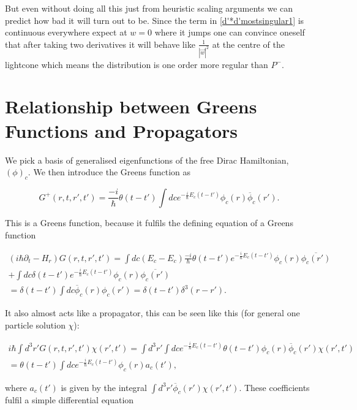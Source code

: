 \documentclass[a4paper,11pt]{article}
\begin{document}
But even without doing all this just from heuristic scaling arguments we can predict how bad it will turn out to be. 
Since the term in 
\eqref{d'*d'mostsingular1} is continuous everywhere expect at \(w=0\) where it jumps one can convince oneself that
after taking two derivatives it will behave like \(\frac{1}{|\vec{w}|^2}\) at the centre of the lightcone which means the 
distribution is one order more regular than \(P^-\).



\appendix
\section{Relationship between Greens Functions and Propagators}\label{AppendixPropagatorGreens}

We pick a basis of generalised eigenfunctions of the free Dirac Hamiltonian, \((\phi)_c\). We then introduce the Greens function as

\begin{equation}
G^+(r,t,r',t')=\frac{-i}{\hbar} \theta(t-t') \int dc e^{-\frac{i}{\hbar} E_c(t-t')} \phi_c (r)\overline{\phi}_c(r') .
\end{equation}

This is a Greens function, because it fulfils the defining equation of a Greens function

\begin{align}
(i\hbar \partial_t -H_r) G(r,t,r',t')=\int dc  (E_c-E_c)\frac{-i}{\hbar} \theta(t-t')  e^{-\frac{i}{\hbar} E_c(t-t')} \phi_c(r)  \overline{\phi_c(r')} \\
+ \int dc \delta(t-t') e^{-\frac{i}{\hbar} E_c(t-t')} \phi_c(r) \overline{\phi_c(r')} \\
= \delta(t-t') \int dc \overline{\phi}_c (r) \phi_c (r')=\delta(t-t') \delta^3(r-r').
\end{align}

It also almost acts like a propagator, this can be seen like this (for general one particle solution \(\chi\)):

\begin{align}
i\hbar \int d^3 r' G(r,t,r',t') \chi(r',t') 
= \int d^3 r' \int dc e^{-\frac{i}{\hbar} E_c (t-t')} \theta (t-t') \phi_c (r) \overline{\phi}_c(r') \chi (r',t')\\
=\theta(t-t') \int dc e^{-\frac{i}{\hbar} E_c(t-t')} \phi_c(r) a_c (t'),\label{Greensfunction propagation}
\end{align}

where \(a_c(t')\) is given by the integral \(\int d^3 r' \overline{\phi}_c(r') \chi(r',t')\). These coefficients fulfil a simple differential equation
\end{document}

